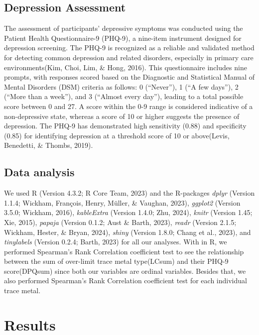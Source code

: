 \documentclass[
  man,floatsintext]{apa6}
\begin{document}
\hypertarget{depression-assessment}{%
\subsection{Depression Assessment}\label{depression-assessment}}

The assessment of participants' depressive symptoms was conducted using the Patient Health Questionnaire-9 (PHQ-9), a nine-item instrument designed for depression screening. The PHQ-9 is recognized as a reliable and validated method for detecting common depression and related disorders, especially in primary care environments(Kim, Choi, Lim, \& Hong, 2016). This questionnaire includes nine prompts, with responses scored based on the Diagnostic and Statistical Manual of Mental Disorders (DSM) criteria as follows: 0 (``Never''), 1 (``A few days''), 2 (``More than a week''), and 3 (``Almost every day''), leading to a total possible score between 0 and 27. A score within the 0-9 range is considered indicative of a non-depressive state, whereas a score of 10 or higher suggests the presence of depression. The PHQ-9 has demonstrated high sensitivity (0.88) and specificity (0.85) for identifying depression at a threshold score of 10 or above(Levis, Benedetti, \& Thombs, 2019).

\hypertarget{data-analysis}{%
\subsection{Data analysis}\label{data-analysis}}

We used R (Version 4.3.2; R Core Team, 2023) and the R-packages \emph{dplyr} (Version 1.1.4; Wickham, François, Henry, Müller, \& Vaughan, 2023), \emph{ggplot2} (Version 3.5.0; Wickham, 2016), \emph{kableExtra} (Version 1.4.0; Zhu, 2024), \emph{knitr} (Version 1.45; Xie, 2015), \emph{papaja} (Version 0.1.2; Aust \& Barth, 2023), \emph{readr} (Version 2.1.5; Wickham, Hester, \& Bryan, 2024), \emph{shiny} (Version 1.8.0; Chang et al., 2023), and \emph{tinylabels} (Version 0.2.4; Barth, 2023) for all our analyses. With in R, we performed Spearman's Rank Correlation coefficient test to see the relationship between the sum of over-limit trace metal type(LCsum) and their PHQ-9 score(DPQsum) since both our variables are ordinal variables. Besides that, we also performed Spearman's Rank Correlation coefficient test for each individual trace metal.

\hypertarget{results}{%
\section{Results}\label{results}}
\end{document}
